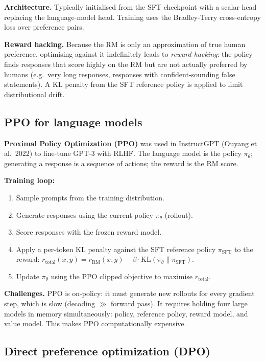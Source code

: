 \textbf{Architecture.} Typically initialised from the SFT checkpoint with a scalar
head replacing the language-model head. Training uses the Bradley-Terry cross-entropy
loss over preference pairs.

\textbf{Reward hacking.} Because the RM is only an approximation of true human
preference, optimising against it indefinitely leads to \emph{reward hacking}: the
policy finds responses that score highly on the RM but are not actually preferred by
humans (e.g.\ very long responses, responses with confident-sounding false statements).
A KL penalty from the SFT reference policy is applied to limit distributional drift.

\subsection{PPO for language models}

\textbf{Proximal Policy Optimization (PPO)} was used in InstructGPT (Ouyang et al.\ 2022)
to fine-tune GPT-3 with RLHF. The language model is the policy $\pi_\theta$; generating
a response is a sequence of actions; the reward is the RM score.

\textbf{Training loop:}
\begin{enumerate}
  \item Sample prompts from the training distribution.
  \item Generate responses using the current policy $\pi_\theta$ (rollout).
  \item Score responses with the frozen reward model.
  \item Apply a per-token KL penalty against the SFT reference policy $\pi_\text{SFT}$
    to the reward: $r_\text{total}(x,y) = r_\text{RM}(x,y) - \beta \cdot \text{KL}(\pi_\theta \| \pi_\text{SFT})$.
  \item Update $\pi_\theta$ using the PPO clipped objective to maximise $r_\text{total}$.
\end{enumerate}

\textbf{Challenges.} PPO is on-policy: it must generate new rollouts for every gradient
step, which is slow (decoding $\gg$ forward pass). It requires holding four large models
in memory simultaneously: policy, reference policy, reward model, and value model. This
makes PPO computationally expensive.

\subsection{Direct preference optimization (DPO)}


